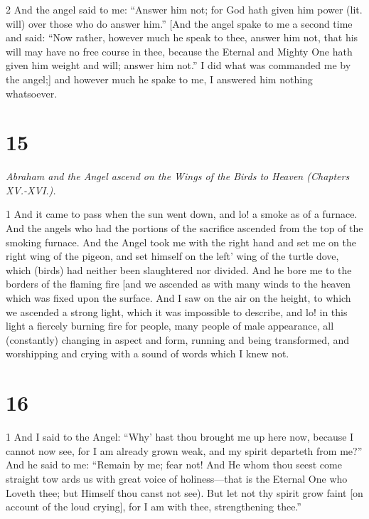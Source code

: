 \par 2 And the angel said to me: “Answer him not; for God hath given him power (lit. will) over those who do answer him.” [And the angel spake to me a second time and said: “Now rather, however much he speak to thee, answer him not, that his will may have no free course in thee, because the Eternal and Mighty One hath given him weight and will; answer him not.” I did what was commanded me by the angel;] and however much he spake to me, I answered him nothing whatsoever. 

\chapter{15}

\par \textit{Abraham and the Angel ascend on the Wings of the Birds to Heaven (Chapters XV.-XVI.).}

\par 1 And it came to pass when the sun went down, and lo! a smoke as of a furnace. And the angels who had the portions of the sacrifice ascended from the top of the smoking furnace. And the Angel took me with the right hand and set me on the right wing of the pigeon, and set himself on the left' wing of the turtle dove, which (birds) had neither been slaughtered nor divided. And he bore me to the borders of the flaming fire [and we ascended as with many winds to the heaven which was fixed upon the surface. And I saw on the air on the height, to which we ascended a strong light, which it was impossible to describe, and lo! in this light a fiercely burning fire for people, many people of male appearance, all (constantly) changing in aspect and form, running and being transformed, and worshipping and crying with a sound of words which I knew not. 

\chapter{16}

\par 1 And I said to the Angel: “Why' hast thou brought me up here now, because I cannot now see, for I am already grown weak, and my spirit departeth from me?” And he said to me: “Remain by me; fear not! And He whom thou seest come straight tow ards us with great voice of holiness—that is the Eternal One who Loveth thee; but Himself thou canst not see). But let not thy spirit grow faint [on account of the loud crying], for I am with thee, strengthening thee.”

